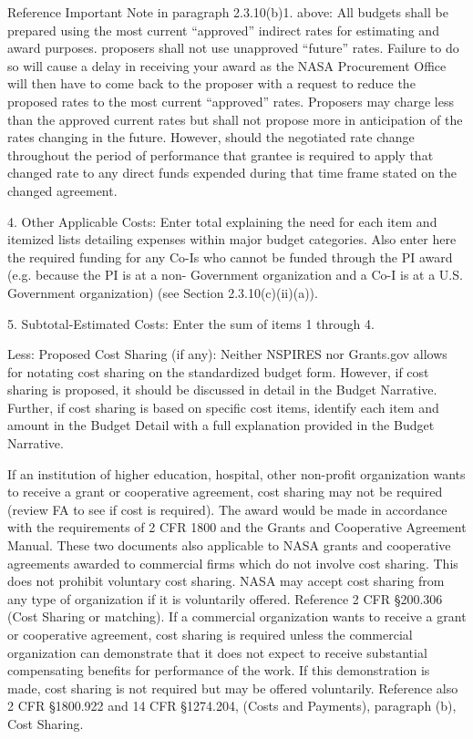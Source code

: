 \documentclass[12pt]{article}
\begin{document}
Reference Important Note in paragraph 2.3.10(b)1. above: All budgets
shall be prepared using the most current ``approved'' indirect rates for
estimating and award purposes. proposers shall not use unapproved
``future'' rates. Failure to do so will cause a delay in receiving your
award as the NASA Procurement Office will then have to come back to
the proposer with a request to reduce the proposed rates to the most
current ``approved'' rates. Proposers may charge less than the approved
current rates but shall not propose more in anticipation of the rates
changing in the future. However, should the negotiated rate change
throughout the period of performance that grantee is required to apply
that changed rate to any direct funds expended during that time frame
stated on the changed agreement.


4. Other Applicable Costs: Enter total explaining the need for each
   item and itemized lists detailing expenses within major budget
   categories. Also enter here the required funding for any Co-Is who
   cannot be funded through the PI award (e.g. because the PI is at a
   non- Government organization and a Co-I is at a U.S. Government
   organization) (see Section 2.3.10(c)(ii)(a)).

5. Subtotal-Estimated Costs: Enter the sum of items 1 through 4.

Less: Proposed Cost Sharing (if any): Neither NSPIRES nor Grants.gov
allows for notating cost sharing on the standardized budget
form. However, if cost sharing is proposed, it should be discussed in
detail in the Budget Narrative. Further, if cost sharing is based on
specific cost items, identify each item and amount in the Budget
Detail with a full explanation provided in the Budget Narrative.

If an institution of higher education, hospital, other non-profit
organization wants to receive a grant or cooperative agreement, cost
sharing may not be required (review FA to see if cost is
required). The award would be made in accordance with the requirements
of 2 CFR 1800 and the Grants and Cooperative Agreement Manual. These
two documents also applicable to NASA grants and cooperative
agreements awarded to commercial firms which do not involve cost
sharing. This does not prohibit voluntary cost sharing. NASA may
accept cost sharing from any type of organization if it is voluntarily
offered. Reference 2 CFR \S200.306 (Cost Sharing or matching). If a
commercial organization wants to receive a grant or cooperative
agreement, cost sharing is required unless the commercial organization
can demonstrate that it does not expect to receive substantial
compensating benefits for performance of the work. If this
demonstration is made, cost sharing is not required but may be offered
voluntarily. Reference also 2 CFR \S1800.922 and 14 CFR \S1274.204,
(Costs and Payments), paragraph (b), Cost Sharing.
\end{document}

